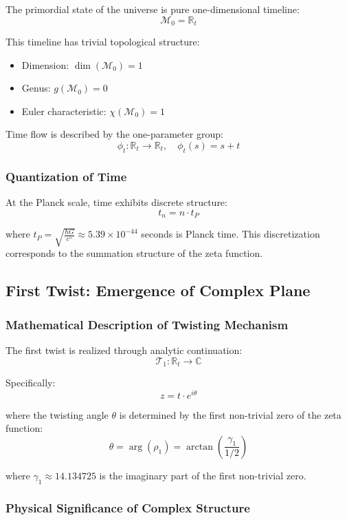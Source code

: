 \documentclass[11pt]{article}
\begin{document}
The primordial state of the universe is pure one-dimensional timeline:
$$\mathcal{M}_0 = \mathbb{R}_t$$

This timeline has trivial topological structure:
\begin{itemize}
\item Dimension: $\dim(\mathcal{M}_0) = 1$
\item Genus: $g(\mathcal{M}_0) = 0$
\item Euler characteristic: $\chi(\mathcal{M}_0) = 1$
\end{itemize}

Time flow is described by the one-parameter group:
$$\phi_t: \mathbb{R}_t \to \mathbb{R}_t, \quad \phi_t(s) = s + t$$

\subsubsection{Quantization of Time}

At the Planck scale, time exhibits discrete structure:
$$t_n = n \cdot t_P$$

where $t_P = \sqrt{\frac{\hbar G}{c^5}} \approx 5.39 \times 10^{-44}$ seconds is Planck time. This discretization corresponds to the summation structure of the zeta function.

\subsection{First Twist: Emergence of Complex Plane}

\subsubsection{Mathematical Description of Twisting Mechanism}

The first twist is realized through analytic continuation:
$$\mathcal{T}_1: \mathbb{R}_t \to \mathbb{C}$$

Specifically:
$$z = t \cdot e^{i\theta}$$

where the twisting angle $\theta$ is determined by the first non-trivial zero of the zeta function:
$$\theta = \arg(\rho_1) = \arctan\left(\frac{\gamma_1}{1/2}\right)$$

where $\gamma_1 \approx 14.134725$ is the imaginary part of the first non-trivial zero.

\subsubsection{Physical Significance of Complex Structure}
\end{document}
